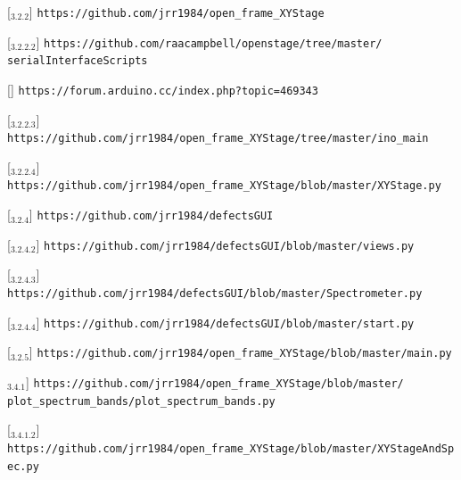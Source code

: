 [\href{https://github.com/jrr1984/open\_frame\_XYStage}{\faGithub$_{3.2.2}$}] \texttt{https://github.com/jrr1984/open\_frame\_XYStage}

[\href{https://github.com/raacampbell/openstage/tree/master/serialInterfaceScripts}{\faGithub$_{3.2.2.2}$}] \texttt{https://github.com/raacampbell/openstage/tree/master/\\\hspace{1.5cm}serialInterfaceScripts}

[\href{https://forum.arduino.cc/index.php?topic=469343}{\faCode}] \texttt{https://forum.arduino.cc/index.php?topic=469343}

[\href{https://github.com/jrr1984/open\_frame\_XYStage/tree/master/ino\_main}{\faGithub$_{3.2.2.3}$}] \texttt{https://github.com/jrr1984/open\_frame\_XYStage/tree/master/ino\_main}

[\href{https://github.com/jrr1984/open\_frame\_XYStage/blob/master/XYStage.py}{\faGithub$_{3.2.2.4}$}] \texttt{https://github.com/jrr1984/open\_frame\_XYStage/blob/master/XYStage.py}

[\href{https://github.com/jrr1984/defectsGUI}{\faGithub$_{3.2.4}$}] \texttt{https://github.com/jrr1984/defectsGUI}

[\href{https://github.com/jrr1984/defectsGUI/blob/master/views.py}{\faGithub$_{3.2.4.2}$}] \texttt{https://github.com/jrr1984/defectsGUI/blob/master/views.py}

[\href{https://github.com/jrr1984/defectsGUI/blob/master/Spectrometer.py}{\faGithub$_{3.2.4.3}$}] \texttt{https://github.com/jrr1984/defectsGUI/blob/master/Spectrometer.py}

[\href{https://github.com/jrr1984/defectsGUI/blob/master/start.py}{\faGithub$_{3.2.4.4}$}] \texttt{https://github.com/jrr1984/defectsGUI/blob/master/start.py}

[\href{https://github.com/jrr1984/open\_frame\_XYStage/blob/master/main.py}{\faGithub$_{3.2.5}$}] \texttt{https://github.com/jrr1984/open\_frame\_XYStage/blob/master/main.py}

\href{https://github.com/jrr1984/open\_frame\_XYStage/blob/master/plot\_spectrum\_bands/plot\_spectrum\_bands.py}{\faGithub$_{3.4.1}$}] \texttt{https://github.com/jrr1984/open\_frame\_XYStage/blob/master/\\\hspace{1.5cm}plot\_spectrum\_bands/plot\_spectrum\_bands.py}

[\href{https://github.com/jrr1984/open\_frame\_XYStage/blob/master/XYStageAndSpec.py}{\faGithub$_{3.4.1.2}$}] \texttt{https://github.com/jrr1984/open\_frame\_XYStage/blob/master/XYStageAndSpec.py}

